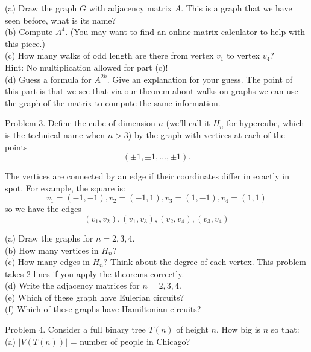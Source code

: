 \documentclass[16 pt]{amsart}
\theoremstyle{definition}
\theoremstyle{remark}
\numberwithin{equation}{subsection}
\begin{document}
(a) Draw the graph $G$ with adjacency matrix $A$.  This is a graph that we have seen before, what is its name?\\

(b) Compute $A^4$.  (You may want to find an online matrix calculator to help with this piece.)\\

(c) How many walks of odd length are there from vertex $v_1$ to vertex $v_4$?\\ 

Hint: No multiplication allowed for part (c)!\\

(d) Guess a formula for $A^{2k}$. Give an explanation for your guess.  The point of this part is that we see that via our theorem about walks on graphs we can use the graph of the matrix to compute the same information.

\newpage

Problem 3. Define the cube of dimension $n$ (we'll call it $H_n$ for hypercube, which is the technical name when $n>3$) by the graph with vertices at each of the points
\[
(\pm 1,\pm 1, \dots, \pm 1).
\]

The vertices are connected by an edge if their coordinates differ in exactly in spot.  For example, the square is:
\[
v_1 = (-1,-1), v_2= (-1,1), v_3 = (1,-1),v_4=(1,1)
\]
so we have the edges
\[
(v_1,v_2),(v_1,v_3),(v_2,v_4),(v_3,v_4)
\]

(a) Draw the graphs for $n=2,3,4$.\\

(b) How many vertices in $H_n$?\\

(c) How many edges in $H_n$?  Think about the degree of each vertex.  This problem takes 2 lines if you apply the theorems correctly.\\

(d) Write the adjacency matrices for $n=2,3,4$.\\

(e) Which of these graph have Eulerian circuits?\\

(f) Which of these graphs have Hamiltonian circuits?

\newpage

Problem 4. Consider a full binary tree $T(n)$ of height $n$.  How big is $n$ so that:\\

(a) $|V(T(n))|$ = number of people in Chicago?\\
\end{document}
